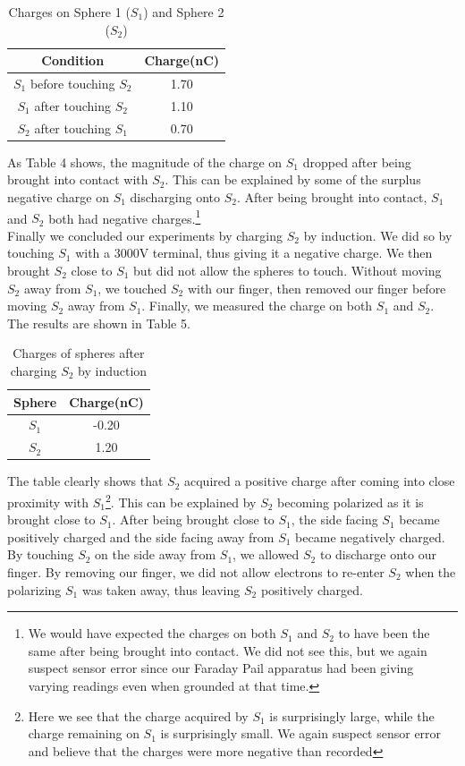 \documentclass[12pt]{amsart}
\begin{document}
\begin{table}[H]
	\begin{tabular}{ |c|c|}
		\hline
		 Condition& Charge(nC)\\
		\hline
		$S_1$ before touching $S_2$&1.70\\
		$S_1$ after touching $S_2$&1.10\\
		$S_2$ after touching $S_1$&0.70\\
		\hline	
	\end{tabular}
	\caption{Charges on Sphere 1 ($S_1$) and Sphere 2 ($S_2$)}
\end{table}

\indent As Table 4 shows, the magnitude of the charge on $S_1$ dropped after being brought into contact with $S_2$. This can be explained by some of the surplus negative charge on $S_1$ discharging onto $S_2$. After being brought into contact, $S_1$ and $S_2$ both had negative charges.\footnote{We would have expected the charges on both $S_1$ and $S_2$ to have been the same after being brought into contact. We did not see this, but we again suspect sensor error since our Faraday Pail apparatus had been giving varying readings even when grounded at that time.}\\

\indent Finally we concluded our experiments by charging $S_2$ by induction. We did so by touching $S_1$ with a 3000V terminal, thus giving it a negative charge. We then brought $S_2$ close to $S_1$ but did not allow the spheres to touch. Without moving $S_2$ away from $S_1$, we touched $S_2$ with our finger, then removed our finger before moving $S_2$ away from $S_1$. Finally, we measured the charge on both $S_1$ and $S_2$. The results are shown in Table 5.

\begin{table}[H]
	\begin{tabular}{ |c|c|}
		\hline
		Sphere & Charge(nC)\\
		\hline
		$S_1$&-0.20\\
		$S_2$&1.20\\
		\hline	
	\end{tabular}
	\caption{Charges of spheres after charging $S_2$ by induction}
\end{table}

\indent The table clearly shows that $S_2$ acquired a positive charge after coming into close proximity with $S_1$\footnote{Here we see that the charge acquired by $S_1$ is surprisingly large, while the charge remaining on $S_1$ is surprisingly small. We again suspect sensor error and believe that the charges were more negative than recorded}. This can be explained by $S_2$ becoming polarized as it is brought close to $S_1$. After being brought close to $S_1$, the side facing $S_1$ became positively charged and the side facing away from $S_1$ became negatively charged. By touching $S_2$ on the side away from $S_1$, we allowed $S_2$ to discharge onto our finger. By removing our finger, we did not allow electrons to re-enter $S_2$ when the polarizing $S_1$ was taken away, thus leaving $S_2$ positively charged.
\end{document}

